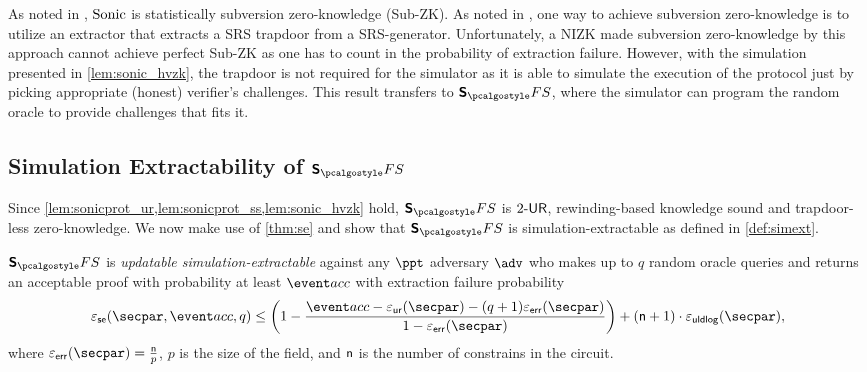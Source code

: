 \begin{remark} 
  As noted in \cite{CCS:MBKM19}, ${\textnormal{{Sonic}}}$ is statistically subversion zero-knowledge (Sub-ZK). As noted in \cite{AC:ABLZ17short}, one way to achieve
  subversion zero-knowledge is to utilize an extractor that extracts a SRS
  trapdoor from a SRS-generator. Unfortunately, a NIZK made subversion
  zero-knowledge by this approach cannot achieve perfect Sub-ZK as one has to
  count in the probability of extraction failure. However, with the simulation
  presented in \cref{lem:sonic_hvzk}, the trapdoor is not required for the
  simulator as it is able to simulate the execution of the protocol just by
  picking appropriate (honest) verifier's challenges. This result transfers to
  $\sonicprotfs$, where the simulator can program the random oracle to provide
  challenges that fits it.
\end{remark}


\subsection{Simulation Extractability of $\sonicprotfs$}
Since \cref{lem:sonicprot_ur,lem:sonicprot_ss,lem:sonic_hvzk} hold, $\sonicprotfs$ is ${2\text{-}\mathsf{UR}}$, rewinding-based knowledge sound and trapdoor-less zero-knowledge. We now make use
of \cref{thm:se} and show that $\sonicprotfs$ is simulation-extractable as defined in \cref{def:simext}.

\begin{corollary}
  \label{thm:sonicprotfs_se}
  $\sonicprotfs$ is \emph{updatable simulation-extractable} against any $\ppt$ adversary $\advse$ who makes up to $q$ random oracle queries and returns an acceptable proof with probability at least $\accProb$ with extraction failure probability 
\[
  \epsse(\secpar, \accProb, q) \leq \left(1 - \frac{\accProb - \epsur (\secpar) - (q + 1) \epserr (\secpar)} {1 - \epserr (\secpar)}\right) + (\noofc + 1) \cdot \epsuldlog (\secpar) ,
\]
where $\epserr (\secpar) = \frac{\noofc}{p}$, $p$ is the size of the field, and $\mathsf{n}$ is the number of constrains in the circuit. 
\end{corollary}

